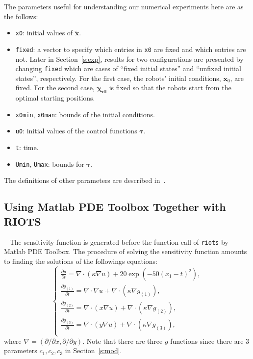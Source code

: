 The parameters useful for understanding our numerical experiments here are as the follows:
\begin{itemize}
    \item {\tt x0}: initial values of $\mathbf{\tilde x}$.
    \item {\tt fixed}: a vector to specify which entries in {\tt x0} are fixed and which entries are not. Later in Section~\ref{s:exp}, results for two   configurations are presented by changing {\tt fixed} which are    cases of ``fixed initial states'' and ``unfixed initial states'', respectively. For the first case, the robots' initial conditions, $\mathbf{x}_0$, are fixed. For the second case, $\mathbf{\chi_{dl}}$ is fixed so that the robots start from the optimal starting positions.
    \item {\tt x0min}, {\tt x0man}: bounds of the initial conditions.
    \item {\tt u0}: initial values of the control functions $\mathbf{\tau}$.
    \item {\tt t}: time.
    \item {\tt Umin}, {\tt Umax}: bounds for $\mathbf{\tau}$.
\end{itemize}
The definitions of other parameters are described in~\cite{ChenRIOTS}.

\subsection{Using Matlab PDE Toolbox Together with RIOTS}~\label{s:together}
The sensitivity function is generated before the function call of {\tt riots} by Matlab PDE Toolbox. The procedure of solving the sensitivity function amounts to finding the solutions of the followings equations:
    $$\left\{%
\begin{array}{ll}
   \displaystyle \frac{\partial u}{\partial t}=\nabla \cdot (\kappa \nabla u) + 20\exp(-50(x_1-t)^2), \\
   \displaystyle  \frac{\partial g_{(1)}}{\partial t}=\nabla \cdot \nabla u + \nabla \cdot (\kappa \nabla g_{(1)}), \\
    \displaystyle \frac{\partial g_{(2)}}{\partial t}=\nabla \cdot (x \nabla u) + \nabla \cdot (\kappa \nabla g_{(2)}), \\
    \displaystyle  \frac{\partial g_{(3)}}{\partial t}=\nabla \cdot (y \nabla u) + \nabla \cdot (\kappa \nabla g_{(3)}), \\
\end{array}\right.     $$
 where  $\nabla= (\partial/\partial x, \partial/\partial y)$.  Note that there are three $g$ functions  since there are 3 parameters $c_1, c_2, c_3$ in Section~\ref{s:mod}.



